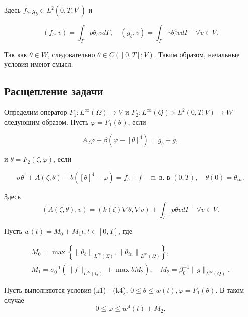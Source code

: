 Здесь $f_{b}, g_{b} \in L^{2}\left(0, T ; V^{\prime}\right)$ и

\[
    \left(f_{b}, v\right)=\int_{\Gamma} p \theta_{b} v d \Gamma,
    \quad\left(g_{b}, v\right)=
    \int_{\Gamma} \gamma \theta_{b}^{4} v d \Gamma \quad \forall v \in V.
\]

\begin{remark}
    Так как $\theta \in W$, следовательно $\theta \in C([0, T] ; V)$.
    Таким образом, начальные условия имеют смысл.
\end{remark}

\subsection{Расщепление задачи}
\label{subsec:ch1/sec5/subsec2}

Определим оператор $F_{1}: L^{\infty}(\Omega) \rightarrow V$ и
$F_{2}: L^{\infty}(Q) \times L^{2}(0, T ; V) \rightarrow W$ следующим образом.
Пусть $\varphi=F_{1}(\theta)$, если

\begin{equation}
    \label{eq:1_6:6}
    A_{2} \varphi+\beta\left(\varphi-[\theta]^{4}\right)=g_{b}+g,
\end{equation}

и $\theta=F_{2}(\zeta, \varphi)$, если

\begin{equation}
    \label{eq:1_6:7}
    \sigma \theta^{\prime}+A(\zeta, \theta)
    +b\left([\theta]^{4}-\varphi\right)=f_{b}+f
    \quad \text { п. в. в }(0, T), \quad \theta(0)=\theta_{i n}.
\end{equation}

Здесь
\[
    (A(\zeta, \theta), v)=(k(\zeta) \nabla \theta, \nabla v)
    +\int_{\Gamma} p \theta v d \Gamma \quad \forall v \in V.
\]

Пусть $w(t)=M_{0}+M_{1} t, t \in[0, T]$, где

\[
    \begin{gathered}
        M_{0}=\max \left\{\left\|\theta_{b}\right\|_{L^{\infty}(\Sigma)},
        \left\|\theta_{i n}\right\|_{L^{\infty}(\Omega)}\right\}, \\
        M_{1}=\sigma_{0}^{-1}\left(\|f\|_{L^{\infty}(Q)}+\max b M_{2}\right),
        \quad M_{2}=\beta_{0}^{-1}\|g\|_{L^{\infty}(Q)}.
    \end{gathered}
\]

\begin{lemma}
    \label{lm:1_6:1}
    Пусть выполняются условия (k1) - (k4), $0 \leq \theta \leq w(t), \varphi=F_{1}(\theta)$.
    В таком случае
    \begin{equation}
        \label{eq:1_6:8}
        0 \leq \varphi \leq w^{4}(t)+M_2.
    \end{equation}
\end{lemma}

